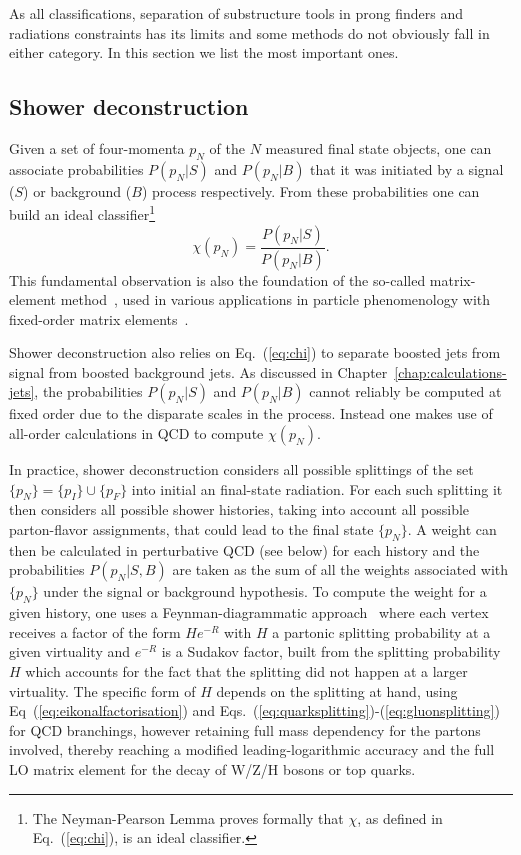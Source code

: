 As all classifications, separation of substructure tools in prong
finders and radiations constraints has its limits and some methods do
not obviously fall in either category.
%
In this section we list the most important ones.

\subsection{Shower deconstruction}\label{shower_dec}

Given a set of four-momenta $p_N$ of the $N$ measured final state
objects, one can associate probabilities $P(p_N|S)$ and
$P(p_N|B)$ that it was initiated by a signal ($S$) or background
($B$) process respectively.
%
From these probabilities one can build an ideal classifier\footnote{The Neyman-Pearson Lemma proves formally that $\chi$, as defined in Eq.~(\ref{eq:chi}), is an ideal classifier.} 
\begin{equation}
\chi(p_N) =\frac{P(p_N|S)}{P(p_N|B)}.
\label{eq:chi}
\end{equation} 
This fundamental observation is also the foundation of the so-called
matrix-element method~\cite{Kondo:1988yd, Abazov:2004cs}, used in
various applications in particle phenomenology with fixed-order matrix
elements~\cite{Artoisenet:2013vfa, Cranmer:2006zs, Andersen:2012kn}.

Shower deconstruction also relies on Eq.~(\ref{eq:chi}) to separate
boosted jets from signal from boosted background jets.
%
As discussed in Chapter~\ref{chap:calculations-jets}, the probabilities
$P(p_N|S)$ and $P(p_N|B)$ cannot reliably be computed at fixed order due
to the disparate scales in the process.
%
Instead one makes use of all-order calculations in QCD to compute
$\chi(p_N)$.

In practice, shower deconstruction considers all possible splittings
of the set $\{p_N\}=\{p_I\}\cup \{p_F\}$ into initial an final-state
radiation. For each such splitting it then considers all possible
shower histories, taking into account all possible parton-flavor
assignments, that could lead to the final state $\{p_N\}$.
%
A weight can then be calculated in perturbative QCD (see below) for
each history and the probabilities $P(p_N|S,B)$ are taken as the sum of
all the weights associated with $\{p_N\}$ under the signal or
background hypothesis.
%
To compute the weight for a given history, one uses a
Feynman-diagrammatic approach~\cite{Soper:2011cr,Soper:2012pb} where
each vertex receives a factor of the form $H e^{-R}$ with $H$ a
partonic splitting probability at a given virtuality and $e^{-R}$ is a
Sudakov factor, built from the splitting probability $H$ which
accounts for the fact that the splitting did not happen at a larger
virtuality. The specific form of $H$ depends on the splitting at hand,
using \eg Eq~(\ref{eq:eikonalfactorisation}) and
Eqs.~(\ref{eq:quarksplitting})-(\ref{eq:gluonsplitting}) for QCD
branchings, however retaining full mass dependency for the partons involved, thereby reaching a modified leading-logarithmic accuracy and the
full LO matrix element for the decay of W/Z/H bosons or top
quarks.
%


